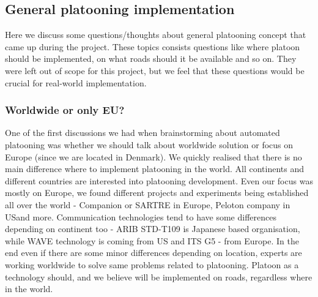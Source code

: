 \subsection{General platooning implementation}
Here we discuss some questions/thoughts about general platooning concept that came up during the project. These topics consists questions like where platoon should be implemented, on what roads should it be available and so on. They were left out of scope for this project, but we feel that these questions would be crucial for real-world implementation.
%
\subsubsection{Worldwide or only EU?}
%
One of the first discussions we had when brainstorming about automated platooning was whether we should talk about worldwide solution or focus on Europe (since we are located in Denmark). We quickly realised that there is no main difference where to implement platooning in the world. All continents and different countries are interested into platooning development. Even our focus was mostly on Europe, we found different projects and experiments being established all over the world - Companion \cite{2016CompanionProject} or SARTRE \cite{Chan2012ProjectSARTRE} in Europe, Peloton company in US\footnotemark and more.
Communication technologies tend to have some differences depending on continent too - ARIB STD-T109 is Japanese based organisation, while WAVE technology is coming from US and ITS G5 - from Europe.
In the end even if there are some minor differences depending on location, experts are working worldwide to solve same problems related to platooning. Platoon as a technology should, and we believe will be implemented on roads, regardless where in the world.
%
